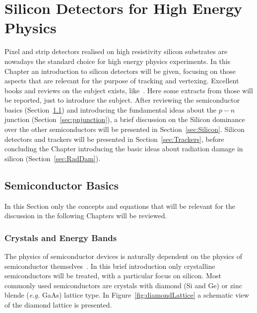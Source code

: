 \chapter{Silicon Detectors for High Energy Physics}
\label{chap:silicon}

Pixel and strip detectors realised on high resistivity silicon substrates are nowadays the standard 
choice for high energy physics experiments. 
In this Chapter an introduction to silicon detectors will be given, focusing 
on those aspects that are relevant for the purpose of tracking and vertexing.
Excellent books and reviews on the subject exists, like~\cite{Lutz:411172,Sze1981,Wang1989,Krammer,Shockley,rossi2006pixel,Hartmann2012,Garcia-Sciveres:2017ymt}. 
Here some extracts from those will be reported, just to introduce the subject. 
After reviewing the semiconductor basics (Section~\ref{sec:SCBase}) and introducing 
the fundamental ideas about the $p-n$ junction (Section~\ref{sec:pnjunction}), a brief discussion on 
the Silicon dominance over the other semiconductors will be presented in Section~\ref{sec:Silicon}. 
Silicon detectors and trackers will be presented in Section~\ref{sec:Trackers}, before concluding 
the Chapter introducing the basic ideas about radiation 
damage in silicon (Section~\ref{sec:RadDam}).
\section{Semiconductor Basics}
\label{sec:SCBase}
In this Section only the concepts and equations that will be relevant for the discussion in the following 
Chapters will be reviewed. 
\subsection{Crystals and Energy Bands}

The physics of semiconductor devices is naturally dependent on the physics of semiconductor 
themselves~\cite{Sze1981}. In this brief introduction only crystalline semiconductors will be treated, 
with a particular focus on silicon. Most commonly used semiconductors are crystals with 
diamond (Si and Ge) or zinc blende ({\it e.g.} GaAs) lattice type. In Figure~\ref{fig:diamondLattice} 
a schematic view of the diamond lattice is presented.


